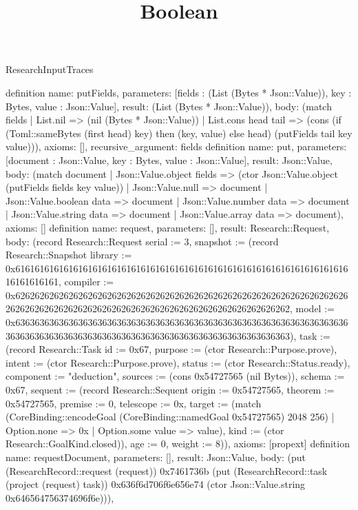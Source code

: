 \begin{lexlean}{ResearchInputTraces}
\title{Boolean}
\begin{semanticmodule}
definition{
 name: putFields,
 parameters: [fields : (List (Bytes * Json::Value)), key : Bytes, value : Json::Value],
 result: (List (Bytes * Json::Value)),
 body: (match fields | List.nil => (nil (Bytes * Json::Value)) | List.cons head tail => (cons (if (Toml::sameBytes (first head) key) then (key, value) else head) (putFields tail key value))),
 axioms: [],
 recursive_argument: fields
}
definition{
 name: put,
 parameters: [document : Json::Value, key : Bytes, value : Json::Value],
 result: Json::Value,
 body: (match document | Json::Value.object fields => (ctor Json::Value.object (putFields fields key value)) | Json::Value.null => document | Json::Value.boolean data => document | Json::Value.number data => document | Json::Value.string data => document | Json::Value.array data => document),
 axioms: []
}
definition{
 name: request,
 parameters: [],
 result: Research::Request,
 body: (record Research::Request {serial := 3, snapshot := (record Research::Snapshot {library := 0x61616161616161616161616161616161616161616161616161616161616161616161616161616161, compiler := 0x62626262626262626262626262626262626262626262626262626262626262626262626262626262626262626262626262626262626262626262626262626262, model := 0x63636363636363636363636363636363636363636363636363636363636363636363636363636363636363636363636363636363636363636363636363636363}), task := (record Research::Task {id := 0x67, purpose := (ctor Research::Purpose.prove), intent := (ctor Research::Purpose.prove), status := (ctor Research::Status.ready), component := "deduction", sources := (cons 0x54727565 (nil Bytes)), schema := 0x67, sequent := (record Research::Sequent {origin := 0x54727565, theorem := 0x54727565, premise := 0, telescope := 0x, target := (match (CoreBinding::encodeGoal (CoreBinding::namedGoal 0x54727565) 2048 256) | Option.none => 0x | Option.some value => value), kind := (ctor Research::GoalKind.closed)}), age := 0, weight := 8})}),
 axioms: [propext]
}
definition{
 name: requestDocument,
 parameters: [],
 result: Json::Value,
 body: (put (ResearchRecord::request (request)) 0x7461736b (put (ResearchRecord::task (project (request) task)) 0x636f6d706f6e656e74 (ctor Json::Value.string 0x646564756374696f6e))),
}
\end{semanticmodule}
\end{lexlean}

